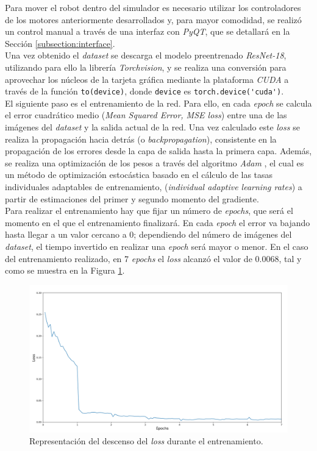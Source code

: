 Para mover el robot dentro del simulador es necesario utilizar los controladores de los motores anteriormente desarrollados y, para mayor comodidad, se realizó un control manual a través de una interfaz con \textit{PyQT}, que se detallará en la Sección \ref{subsection:interface}.\\

Una vez obtenido el \textit{dataset} se descarga el modelo preentrenado \textit{ResNet-18}, utilizando para ello la librería \textit{Torchvision}, y se realiza una conversión para aprovechar los núcleos de la tarjeta gráfica mediante la plataforma \textit{CUDA} a través de la función \verb|to(device)|, donde \verb|device| es \verb|torch.device('cuda')|.\\

El siguiente paso es el entrenamiento de la red. Para ello, en cada \textit{epoch} se calcula el error cuadrático medio (\textit{Mean Squared Error, MSE loss}) entre una de las imágenes del \textit{dataset} y la salida actual de la red. Una vez calculado este \textit{loss} se realiza la propagación hacia detrás (o \textit{backpropagation}), consistente en la propagación de los errores desde la capa de salida hasta la primera capa. Además, se realiza una optimización de los pesos a través del algoritmo \textit{Adam} \cite{adam}, el cual es un método de optimización estocástica basado en el cálculo de las tasas individuales adaptables de entrenamiento, (\textit{individual adaptive learning rates}) a partir de estimaciones del primer y segundo momento del gradiente.\\

Para realizar el entrenamiento hay que fijar un número de \textit{epochs}, que será el momento en el que el entrenamiento finalizará. En cada \textit{epoch} el error va bajando hasta llegar a un valor cercano a 0; dependiendo del número de imágenes del \textit{dataset}, el tiempo invertido en realizar una \textit{epoch} será mayor o menor. En el caso del entrenamiento realizado, en 7 \textit{epochs} el \textit{loss} alcanzó el valor de 0.0068, tal y como se muestra en la Figura \ref{fig:simgraphepoch}.\\
\begin{figure} [h!]
	\begin{center}
		\includegraphics[width=14cm]{figs/simgraphepoch}
	\end{center}
	\caption{Representación del descenso del \textit{loss} durante el entrenamiento.}
	\label{fig:simgraphepoch}
\end{figure}\


